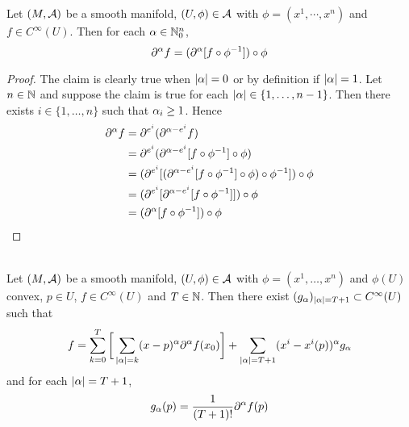 \documentclass{book}
\begin{document}
\begin{ex}
	Let $(M, \mathcal{A})$ be a smooth manifold, $(U, \phi) \in \mathcal{A}$ with $\phi = (x^1, \cdots, x^n)$ and $f \in C^{\infty}(U)$. Then for each $\alpha \in \mathbb{N}_0^n$, $$\partial^{\alpha} f = (\partial^{\alpha}[ f \circ \phi^{-1}] ) \circ \phi$$
\end{ex}	

\begin{proof}
	The claim is clearly true when $|\alpha| =0$ or by definition if $|\alpha| = 1$. Let $n \in \mathbb{N}$ and suppose the claim is true for each $|\alpha| \in \{1, \ldots, n-1 \}$. Then there exists $i \in \{1, \ldots, n\}$ such that $\alpha_i \geq 1$. Hence 
	\begin{align*}
		\partial^{\alpha}f 
		&= \partial^{e^i} (\partial^{\alpha - e^i} f) \\
		&= \partial^{e^i} (\partial^{\alpha - e^i}[ f \circ \phi^{-1}] \circ \phi) \\
		&= (\partial^{e^i} [(\partial^{\alpha - e^i}[ f \circ \phi^{-1}] \circ \phi) \circ \phi^{-1} ]) \circ \phi\\
		&= (\partial^{e^i} [\partial^{\alpha - e^i}[ f \circ \phi^{-1}]] )\circ \phi\\
		&= (\partial^{\alpha}[ f \circ \phi^{-1}] )\circ \phi\\
	\end{align*}
\end{proof}


\begin{ex}  \\
	Let $(M, \mathcal{A})$ be a smooth manifold, $(U, \phi) \in \mathcal{A}$ with $\phi = (x^1, \ldots, x^n)$ and $\phi(U)$ convex, $p \in U$, $f \in C^{\infty}(U)$ and $T \in \mathbb{N}$. Then there exist $(g_{\alpha})_{|\alpha| = T+1} \subset C^{\infty}(U)$ such that
	$$f = \sum_{k=0}^{T} \bigg[\sum_{|\alpha| = k}(x - p)^{\alpha} \partial^{\alpha} f (x_0) \bigg] + \sum_{|\alpha| = T+1}(x^i - x^i(p))^{\alpha} g_{\alpha}$$ and for each $|\alpha|= T+1$, $$g_{\alpha}(p) = \frac{1}{(T+1)!}\partial^{\alpha} f(p)$$
\end{ex}
\end{document}
